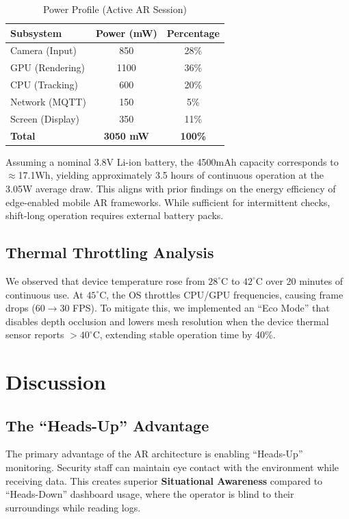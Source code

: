 \documentclass[conference]{IEEEtran}
\begin{document}
\begin{table}[htbp]
\caption{Power Profile (Active AR Session)}
\begin{center}
\begin{tabular}{lcc}
\toprule
\textbf{Subsystem} & \textbf{Power (mW)} & \textbf{Percentage} \\
\midrule
Camera (Input) & 850 & 28\% \\
GPU (Rendering) & 1100 & 36\% \\
CPU (Tracking) & 600 & 20\% \\
Network (MQTT) & 150 & 5\% \\
Screen (Display) & 350 & 11\% \\
\textbf{Total} & \textbf{3050 mW} & \textbf{100\%} \\
\bottomrule
\end{tabular}
\end{center}
\label{tab:power}
\end{table}

Assuming a nominal 3.8V Li-ion battery, the 4500mAh capacity corresponds to $\approx$17.1Wh, yielding approximately 3.5 hours of continuous operation at the 3.05W average draw. This aligns with prior findings on the energy efficiency of edge-enabled mobile AR frameworks. While sufficient for intermittent checks, shift-long operation requires external battery packs.

\subsection{Thermal Throttling Analysis}
We observed that device temperature rose from $28^\circ$C to $42^\circ$C over 20 minutes of continuous use. At $45^\circ$C, the OS throttles CPU/GPU frequencies, causing frame drops ($60 \to 30$ FPS). To mitigate this, we implemented an ``Eco Mode'' that disables depth occlusion and lowers mesh resolution when the device thermal sensor reports $>40^\circ$C, extending stable operation time by 40\%.

\section{Discussion}

\subsection{The ``Heads-Up'' Advantage}
The primary advantage of the AR architecture is enabling ``Heads-Up'' monitoring. Security staff can maintain eye contact with the environment while receiving data. This creates superior \textbf{Situational Awareness} compared to ``Heads-Down'' dashboard usage, where the operator is blind to their surroundings while reading logs.
\end{document}
